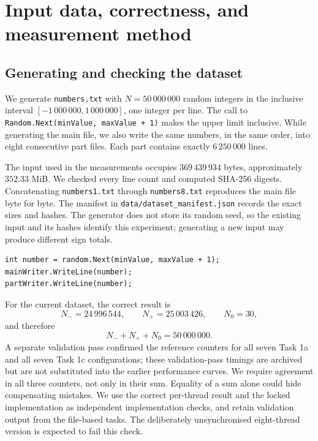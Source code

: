 \chapter{Input data, correctness, and measurement method}
\section{Generating and checking the dataset}
We generate \texttt{numbers.txt} with \(N=50\,000\,000\) random integers in the inclusive interval \([-1\,000\,000,1\,000\,000]\), one integer per line. The call to \texttt{Random.Next(minValue, maxValue + 1)} makes the upper limit inclusive. While generating the main file, we also write the same numbers, in the same order, into eight consecutive part files. Each part contains exactly \(6\,250\,000\) lines.

The input used in the measurements occupies \(369\,439\,934\) bytes, approximately \(352.33\) MiB. We checked every line count and computed SHA-256 digests. Concatenating \texttt{numbers1.txt} through \texttt{numbers8.txt} reproduces the main file byte for byte. The manifest in \texttt{data/dataset\_manifest.json} records the exact sizes and hashes. The generator does not store its random seed, so the existing input and its hashes identify this experiment; generating a new input may produce different sign totals.

\begin{lstlisting}[caption={Generating the same ordered data for the main file and the eight parts.}]
int number = random.Next(minValue, maxValue + 1);
mainWriter.WriteLine(number);
partWriter.WriteLine(number);
\end{lstlisting}

For the current dataset, the correct result is
\begin{equation}
N_{-}=24\,996\,544,\qquad N_{+}=25\,003\,426,\qquad N_{0}=30,
\end{equation}
and therefore
\begin{equation}
N_{-}+N_{+}+N_{0}=50\,000\,000.
\end{equation}
A separate validation pass confirmed the reference counters for all seven Task 1a and all seven Task 1c configurations; these validation-pass timings are archived but are not substituted into the earlier performance curves. We require agreement in all three counters, not only in their sum. Equality of a sum alone could hide compensating mistakes. We use the correct per-thread result and the locked implementation as independent implementation checks, and retain validation output from the file-based tasks. The deliberately unsynchronised eight-thread version is expected to fail this check.

